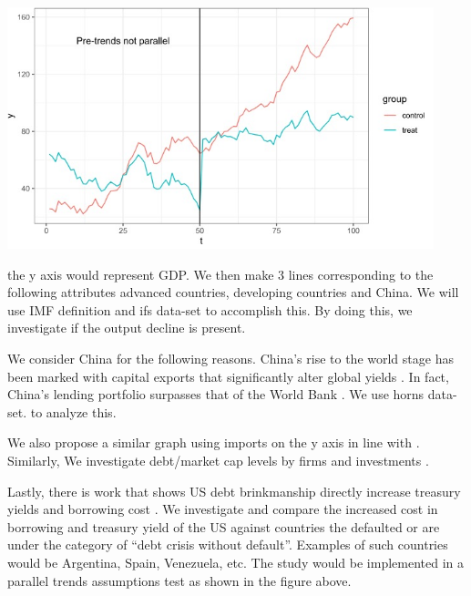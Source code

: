 \documentclass[
  12pt]{article}
\begin{document}
\includegraphics[width=4.875in,height=\textheight]{style-guide/1_year_ERP_parallel_trends.jpeg}

the y axis would represent GDP. We then make 3 lines corresponding to
the following attributes advanced countries, developing countries and
China. We will use IMF definition and ifs data-set to accomplish this.
By doing this, we investigate if the output decline \citep{yeyati2011}
is present.

We consider China for the following reasons. China's rise to the world
stage has been marked with capital exports that significantly alter
global yields \citep{alfaro2014, gourinchas}. In fact, China's lending
portfolio surpasses that of the World Bank \citep{horn2021} . We use
horns data-set. to analyze this.

We also propose a similar graph using imports on the y axis in line with
\citep{mendoza2012}. Similarly, We investigate debt/market cap levels by
firms \citep{corsetti2012, das2010, gourinchas2016} and investments
\citep{almeida2017}.

Lastly, there is work that shows US debt brinkmanship directly increase
treasury yields and borrowing cost \citep{nippani2017}. We investigate
and compare the increased cost in borrowing and treasury yield of the US
against countries the defaulted or are under the category of ``debt
crisis without default''. Examples of such countries would be Argentina,
Spain, Venezuela, etc. The study would be implemented in a parallel
trends assumptions test as shown in the figure above.


\renewcommand\refname{References}
  
\end{document}
